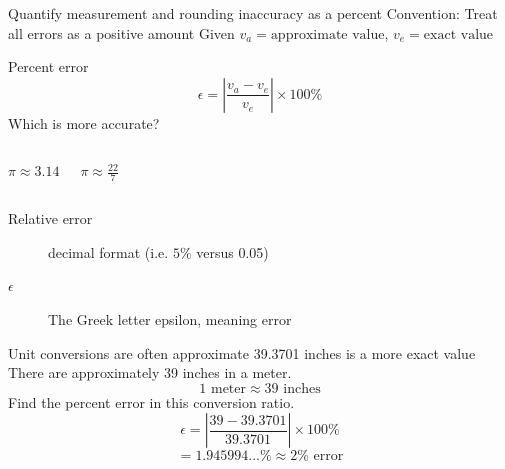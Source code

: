 \begin{frame}{Quantify measurement and rounding inaccuracy as a percent}
    {Convention: Treat all errors as a positive amount}
    Given $v_a= \text{approximate value}$, $v_e= \text{exact value}$ \par \bigskip
    Percent error
    $$\epsilon = \left|\frac{v_a-v_e}{v_e}\right| \times 100\%$$
    \bigskip    
    Which is more accurate? %
        \begin{columns}
                $\pi \approx 3.14$ \par \bigskip
                $\pi \approx \frac{22}{7}$ \par \medskip
        \end{columns}  \vspace{0.5cm}
        \begin{description}
            \item[Relative error] decimal format (i.e. $5\%$ versus 0.05)
            \item[$\epsilon$] The Greek letter epsilon, meaning error
        \end{description}
    \end{frame}
    
\begin{frame}{Unit conversions are often approximate}
    {39.3701 inches is a more exact value}
    There are approximately 39 inches in a meter.
    $$ 1 \text{ meter} \approx 39 \text{ inches}$$
    Find the percent error in this conversion ratio. \vspace{1cm}
    $$\epsilon = \left|\frac{39-39.3701}{39.3701}\right| \times 100\%$$
    $$=1.945994...\% \approx 2\% \text{ error}$$
    \end{frame}

